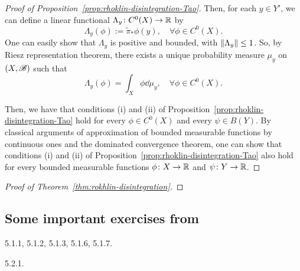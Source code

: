 \begin{proof}[Proof of Proposition~\ref{prop:rhoklin-disintegration-Tao}]
  Then, for each $y\in Y'$, we can define a linear functional $\Lambda_y\colon C^0(X)\to\mathbb{R}$ by
  \begin{displaymath}
    \Lambda_y(\phi):=\tilde \pi_*\phi(y),\quad\forall \phi\in C^0(X).
  \end{displaymath}
  One can easily show that $\Lambda_y$ is positive and bounded, with $\left\|{\Lambda_y}\right\|\leq 1$. So, by Riesz representation theorem, there exists a unique probability measure $\mu_y$ on $(X,\mathscr{B})$ such that
  \begin{displaymath}
    \Lambda_y(\phi)=\int_X \phi\dd\mu_y,\quad\forall \phi\in C^0(X).
  \end{displaymath}

  Then, we have that conditions (i) and (ii) of Proposition~\ref{prop:rhoklin-disintegration-Tao} hold for every $\phi\in C^0(X)$ and every $\psi\in B(Y)$. By classical arguments of approximation of bounded measurable functions by continuous ones and the dominated convergence theorem, one can show that conditions (i) and (ii) of Proposition~\ref{prop:rhoklin-disintegration-Tao} also hold for every bounded measurable functions $\phi\colon X\to\mathbb{R}$ and $\psi\colon Y\to\mathbb{R}$.
\end{proof}


\begin{proof}[Proof of Theorem~\ref{thm:rokhlin-disintegration}]


\end{proof}

\subsection{Some important exercises from~\cite[\S5.1.5 and \S5.2.4]{VianaOliveiraFoundErgTh}}
\label{sec:some-import-exerc-5.1.5}

5.1.1, 5.1.2, 5.1.3, 5.1.6, 5.1.7.

5.2.1.
